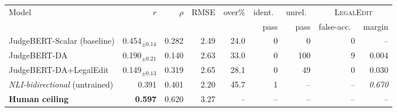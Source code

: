 \setlength{\tabcolsep}{4pt}
\begin{tabular}{lrrrrrrrr}
\toprule
Model & $r$ & $\rho$ & RMSE & over\% & ident.\ & unrel.\ & \multicolumn{2}{c}{\textsc{LegalEdit}} \\
\cmidrule(lr){8-9}
 &  &  &  &  & pass & pass & false-acc.\ & margin \\
\midrule
JudgeBERT-Scalar (baseline) & 0.454$_{\pm0.14}$ & 0.282 & 2.49 & 24.0 & 0 & 0 & 0 & -- \\
\midrule
JudgeBERT-DA & 0.190$_{\pm0.21}$ & 0.140 & 2.63 & 33.0 & 0 & 100 & 9 & 0.004 \\
JudgeBERT-DA+LegalEdit & 0.149$_{\pm0.13}$ & 0.319 & 2.65 & 28.1 & 0 & 49 & 0 & 0.030 \\
\midrule
\emph{NLI-bidirectional} (untrained) & 0.391 & 0.401 & 2.20 & 45.7 & 1 & -- & -- & \emph{0.670} \\
\textbf{Human ceiling} & \textbf{0.597} & 0.620 & 3.27 & -- & -- & -- & -- & -- \\
\bottomrule
\end{tabular}